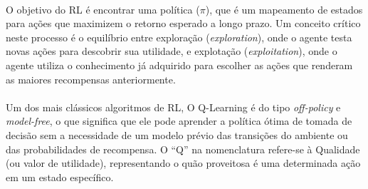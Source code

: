 \paragraph{} O objetivo do RL é encontrar uma política ($\pi$), que é um mapeamento de estados para ações que maximizem o retorno esperado a longo prazo. Um conceito crítico neste processo é o equilíbrio entre exploração (\textit{exploration}), onde o agente testa novas ações para descobrir sua utilidade, e explotação (\textit{exploitation}), onde o agente utiliza o conhecimento já adquirido para escolher as ações que renderam as maiores recompensas anteriormente.

\paragraph{} Um dos mais clássicos algoritmos de RL, O Q-Learning \cite{Watkins92} é do tipo \textit{off-policy} e \textit{model-free}, o que significa que ele pode aprender a política ótima de tomada de decisão sem a necessidade de um modelo prévio das transições do ambiente ou das probabilidades de recompensa. O ``Q'' na nomenclatura refere-se à Qualidade (ou valor de utilidade), representando o quão proveitosa é uma determinada ação em um estado específico.

